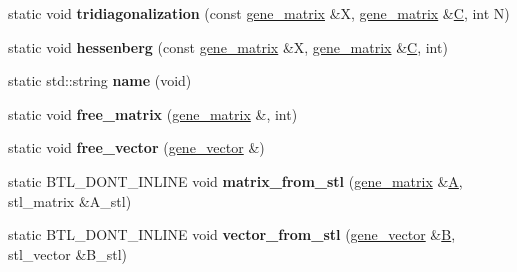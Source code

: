\begin{DoxyCompactItemize}
static void {\bfseries tridiagonalization} (const \hyperlink{group___core___module_class_eigen_1_1_matrix}{gene\+\_\+matrix} \&X, \hyperlink{group___core___module_class_eigen_1_1_matrix}{gene\+\_\+matrix} \&\hyperlink{group___core___module}{C}, int N)
\item 
\mbox{\label{classeigen3__interface_a18b7b90f97d97df74d92bf8d084f839f}} 
static void {\bfseries hessenberg} (const \hyperlink{group___core___module_class_eigen_1_1_matrix}{gene\+\_\+matrix} \&X, \hyperlink{group___core___module_class_eigen_1_1_matrix}{gene\+\_\+matrix} \&\hyperlink{group___core___module}{C}, int)
\item 
\mbox{\label{classeigen3__interface_afc03a46ad86db41de7cd34bcd5099603}} 
static std\+::string {\bfseries name} (void)
\item 
\mbox{\label{classeigen3__interface_a58c597fc0ee6719d4a60ade9acecd200}} 
static void {\bfseries free\+\_\+matrix} (\hyperlink{group___core___module_class_eigen_1_1_matrix}{gene\+\_\+matrix} \&, int)
\item 
\mbox{\label{classeigen3__interface_a0aa4de6c25acfc0c54aaff6522bfffb8}} 
static void {\bfseries free\+\_\+vector} (\hyperlink{group___core___module_class_eigen_1_1_matrix}{gene\+\_\+vector} \&)
\item 
\mbox{\label{classeigen3__interface_a00f3760d334d5039ff0e2f13129240db}} 
static B\+T\+L\+\_\+\+D\+O\+N\+T\+\_\+\+I\+N\+L\+I\+NE void {\bfseries matrix\+\_\+from\+\_\+stl} (\hyperlink{group___core___module_class_eigen_1_1_matrix}{gene\+\_\+matrix} \&\hyperlink{group___core___module_class_eigen_1_1_matrix}{A}, stl\+\_\+matrix \&A\+\_\+stl)
\item 
\mbox{\label{classeigen3__interface_a20b1dfb5d24c22fd0621bbfa4c5ef29b}} 
static B\+T\+L\+\_\+\+D\+O\+N\+T\+\_\+\+I\+N\+L\+I\+NE void {\bfseries vector\+\_\+from\+\_\+stl} (\hyperlink{group___core___module_class_eigen_1_1_matrix}{gene\+\_\+vector} \&\hyperlink{group___core___module_class_eigen_1_1_matrix}{B}, stl\+\_\+vector \&B\+\_\+stl)
\item 
\mbox{\label{classeigen3__interface_a3ff77e166b0399ddb6f6fc3904a8d388}} 

\end{DoxyCompactItemize}
